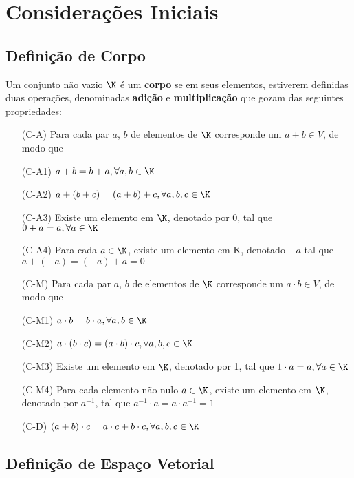 \section{Considerações Iniciais}

\subsection{Definição de Corpo}

Um conjunto não vazio $\K$ é um \textbf{corpo}
se em seus elementos, estiverem definidas
duas operações, denominadas \textbf{adição} e \textbf{multiplicação}
que gozam das seguintes propriedades:

\begin{itemize}
\item[(C-A)] Para cada par $a$, $b$ de elementos de $\K$ corresponde um
$a + b \in V$, de modo que
\item[(C-A1)]
    $a + b = b + a, \forall{a, b} \in \K$
\item[(C-A2)]
    $a + (b + c) = (a + b) + c, \forall{a, b,c} \in \K $
\item[(C-A3)] Existe um elemento em $\K$, denotado por 0, tal que
    $ 0 + a = a, \forall{a} \in \K$
\item[(C-A4)] Para cada $a \in \K$, existe um elemento em K, denotado $-a$ tal que
    $a + (-a) = (-a) + a = 0$ 
    
\item [(C-M)] Para cada par $a$, $b$ de elementos de $\K$ corresponde um
$a \cdot b \in V$, de modo que
\item[(C-M1)]
    $a \cdot b = b \cdot a, \forall{a, b} \in \K$
\item[(C-M2)]
    $a \cdot (b \cdot c) = (a \cdot b) \cdot c, \forall{a, b, c} \in \K$
\item[(C-M3)] Existe um elemento em $\K$, denotado por 1, tal que 
    $ 1 \cdot a = a, \forall{a} \in \K$
\item[(C-M4)] Para cada elemento não nulo $a \in \K$, existe um elemento em $\K$, denotado por $a^{-1}$, tal que 
    $a^{-1} \cdot a = a \cdot a^{-1} = 1$ 
\item[(C-D)]
    $(a + b) \cdot c = a \cdot c + b \cdot c, \forall{a,b,c} \in \K$
\end{itemize}


\subsection{Definição de Espaço Vetorial}

